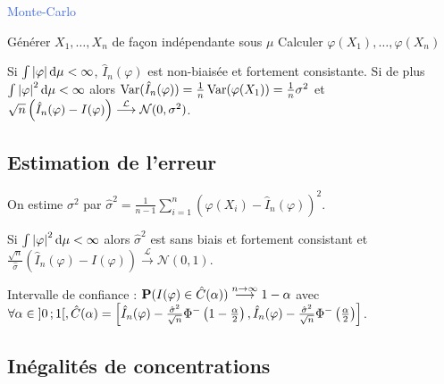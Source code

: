 

\begin{algorithm}[h]
\caption{\textcolor{RoyalBlue}{Monte-Carlo}}
	Générer $X_1,\ldots,X_n$ de façon indépendante sous $\mu$ \;
	Calculer $\varphi(X_1),\ldots,\varphi(X_n)$ \;
\end{algorithm}

\begin{pop}
	Si $\int \left\lvert\varphi\right\rvert \mathop{}\mathopen{}\mathrm{d} \mu < \infty$, $\hat{I}_n(\varphi)$ est non-biaisée et fortement consistante.
	Si de plus $\int \left\lvert\varphi\right\rvert^2 \mathop{}\mathopen{}\mathrm{d} \mu < \infty$ alors $\operatorname{Var}(\hat{I}_n(\varphi)) = \frac{1}{n} \operatorname{Var}(\varphi(X_1)) = \frac{1}{n} \sigma^2$ et $\sqrt{n} \left( \hat{I}_n(\varphi) - I(\varphi) \right) \overset{\mathcal{L}}{\longrightarrow} \mathcal{N}(0,\sigma^2)$.
\end{pop}


\subsection{Estimation de l'erreur}

	On estime $\sigma^2$ par $\hat{\sigma}^2 = \frac{1}{n - 1} \sum_{i = 1}^n \left( \varphi(X_i) - \hat{I}_n(\varphi) \right)^2$.

	\begin{pop}
		Si $\int \left\lvert\varphi\right\rvert^2 \mathop{}\mathopen{}\mathrm{d} \mu < \infty$ alors $\hat \sigma^2$ est sans biais et fortement consistant et $\frac{\sqrt{n}}{\hat{\sigma}} \left( \hat{I}_n(\varphi) - I(\varphi) \right) \overset{\mathcal{L}}{\longrightarrow} \mathcal{N}(0,1)$.
	\end{pop}

	\noindent Intervalle de confiance : $\mathbf{P}(I(\varphi) \in \hat{C}(\alpha)) \overset{n \to \infty}{\longrightarrow} 1 - \alpha$ avec
	$\forall \alpha \in \inoo{0}{1},\linebreak \hat{C}(\alpha) = \left[ \hat{I}_n(\varphi) - \frac{\hat{\sigma}^2}{\sqrt{n}} \Phi^-\left( 1 - \frac{\alpha}{2} \right), \hat{I}_n(\varphi) - \frac{\hat{\sigma}^2}{\sqrt{n}} \Phi^-\left( \frac{\alpha}{2} \right) \right]$.


\subsection{Inégalités de concentrations}

